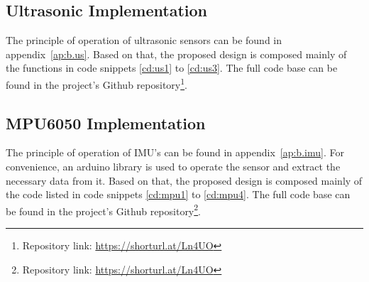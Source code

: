 \subsection{Ultrasonic Implementation}
The principle of operation of ultrasonic sensors can be found in appendix~\ref{ap:b.us}. Based on that, the proposed design is composed mainly of the functions in code snippets \ref{cd:us1} to \ref{cd:us3}. The full code base can be found in the project's Github repository\footnote{Repository link: \url{https://shorturl.at/Ln4UO}}.
\vspace{3mm}

% 
% 
\vspace{3mm}

\newpage


\subsection{MPU6050 Implementation}
\vspace{-1mm}
The principle of operation of IMU's can be found in appendix~\ref{ap:b.imu}. For convenience, an arduino library is used to operate the sensor and extract the necessary data from it. Based on that, the proposed design is composed mainly of the code listed in code snippets \ref{cd:mpu1} to \ref{cd:mpu4}. The full code base can be found in the project's Github repository\footnote{Repository link: \url{https://shorturl.at/Ln4UO}}.

\vspace{1mm}



\newpage
% 


